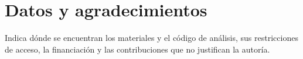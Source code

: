\section*{Datos y agradecimientos}
Indica dónde se encuentran los materiales y el código de análisis, sus restricciones
de acceso, la financiación y las contribuciones que no justifican la autoría.
